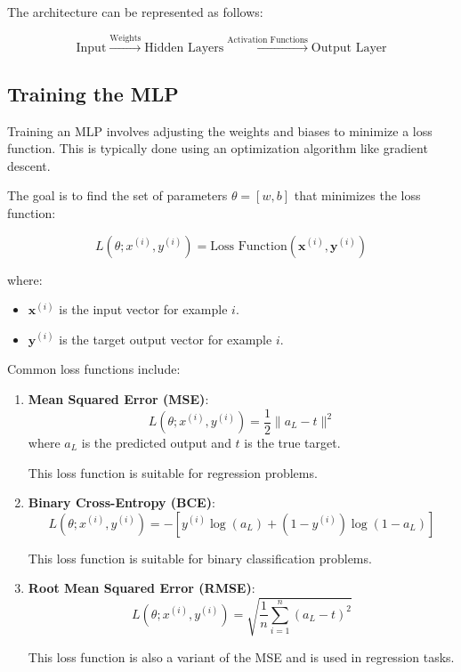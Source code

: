 \documentclass[english]{article}
\begin{document}
The architecture can be represented as follows:

\begin{equation}
    \text{Input} \xrightarrow{\text{Weights}} \text{Hidden Layers} \xrightarrow{\text{Activation Functions}} \text{Output Layer}
\end{equation}

\subsection{Training the MLP}
Training an MLP involves adjusting the weights and biases to minimize a loss function. This is typically done using an optimization algorithm like gradient descent.

The goal is to find the set of parameters \( \theta = [w, b] \) that minimizes the loss function:

\begin{equation}
    L(\theta; x^{(i)}, y^{(i)}) = \text{Loss Function}(\mathbf{x}^{(i)}, \mathbf{y}^{(i)})
\end{equation}

where:
\begin{itemize}
    \item \( \mathbf{x}^{(i)} \) is the input vector for example \( i \).
    \item \( \mathbf{y}^{(i)} \) is the target output vector for example \( i \).
\end{itemize}

Common loss functions include:
\begin{enumerate}[label=]
    \item \textbf{Mean Squared Error (MSE)}: 
        \[
        L(\theta; x^{(i)}, y^{(i)}) = \frac{1}{2} \| a_L - t \|^2
        \]
    where \( a_L \) is the predicted output and \( t \) is the true target.
    
    This loss function is suitable for regression problems.

    \item \textbf{Binary Cross-Entropy (BCE)}:
        \[
        L(\theta; x^{(i)}, y^{(i)}) = -[y^{(i)} \log(a_L) + (1 - y^{(i)}) \log(1 - a_L)]
        \]
    
    This loss function is suitable for binary classification problems.

    \item \textbf{Root Mean Squared Error (RMSE)}:
        \[
        L(\theta; x^{(i)}, y^{(i)}) = \sqrt{\frac{1}{n} \sum_{i=1}^n (a_L - t)^2}
        \]
    
    This loss function is also a variant of the MSE and is used in regression tasks.
\end{enumerate}
\end{document}
